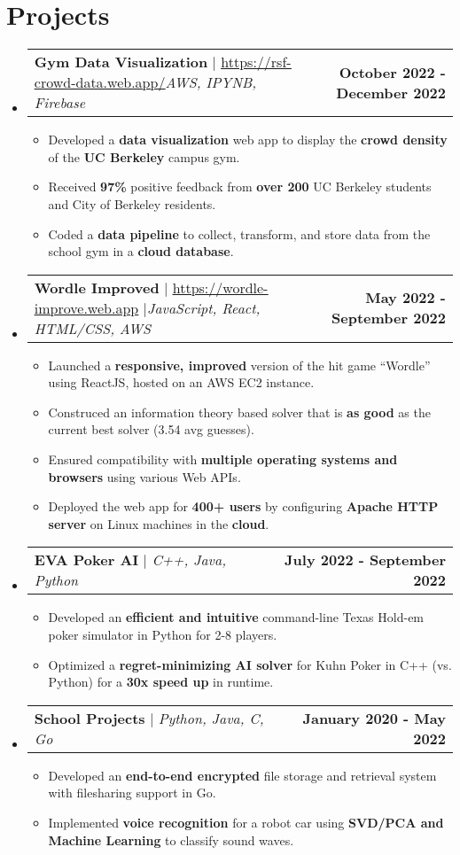 \documentclass[letterpaper,11pt]{article}
\makeatletter
\newcommand{\resumeItem}[1]{
  \item\small{
    {#1 \vspace{-2pt}}
  }
}
\newcommand{\resumeProjectHeading}[2]{
    \item
    \begin{tabular*}{1.001\textwidth}{l@{\extracolsep{\fill}}r}
      \small#1 & \textbf{\small #2}\\
    \end{tabular*}\vspace{-7pt}
}
\newcommand{\resumeSubHeadingListStart}{\begin{itemize}[leftmargin=0.0in, label={}]}
\newcommand{\resumeSubHeadingListEnd}{\end{itemize}}
\newcommand{\resumeItemListStart}{\begin{itemize}}
\newcommand{\resumeItemListEnd}{\end{itemize}\vspace{-5pt}}
\makeatother
\begin{document}
\section{Projects}
    \vspace{-5pt}
    \resumeSubHeadingListStart
    \resumeProjectHeading
      {\textbf{Gym Data Visualization} $|$ \href{https://rsf-crowd-data.web.app/}{\underline{https://rsf-crowd-data.web.app/}}\emph{AWS, IPYNB, Firebase}}{October 2022 - December 2022}
      \resumeItemListStart
      \resumeItem{Developed a \textbf{data visualization} web app to display the \textbf{crowd density} of the \textbf{UC Berkeley} campus gym.}
      \resumeItem{Received \textbf{97\%} positive feedback from \textbf{over 200} UC Berkeley students and City of Berkeley residents.}
      \resumeItem{Coded a \textbf{data pipeline} to collect, transform, and store data from the school gym in a \textbf{cloud database}.}
      \resumeItemListEnd
      \vspace{-13pt}
      \resumeProjectHeading
          {\textbf{Wordle Improved} $|$ \href{https://wordle-improve.web.app/}{\underline{https://wordle-improve.web.app}} $|$\emph{JavaScript, React, HTML/CSS, AWS}}{May 2022 - September 2022}
          \resumeItemListStart
            \resumeItem{Launched a \textbf{responsive, improved} version of the hit game ``Wordle'' using ReactJS, hosted on an AWS EC2 instance.}
            \resumeItem{Construced an information theory based solver that is \textbf{\boldmath{$97\%$} as good} as the current best solver (3.54 avg guesses).}
            \resumeItem{Ensured compatibility with \textbf{multiple operating systems and browsers} using various Web APIs.}
            \resumeItem{Deployed the web app for \textbf{400+ users} by configuring \textbf{Apache HTTP server} on Linux machines in the \textbf{cloud}.}
            \resumeItemListEnd
          \vspace{-13pt}
      \resumeProjectHeading
      {\textbf{EVA Poker AI} $|$ \emph{C++, Java, Python}}{July 2022 - September 2022}
      \resumeItemListStart
            \resumeItem{Developed an \textbf{efficient and intuitive} command-line Texas Hold-em poker simulator in Python for 2-8 players.}
            \resumeItem{Optimized a \textbf{regret-minimizing AI solver} for Kuhn Poker in C++ (vs. Python) for a \textbf{30x speed up} in runtime. }
          \resumeItemListEnd 
          \vspace{-13pt}
      
      \resumeProjectHeading
      {\textbf{School Projects} $|$ \emph{Python, Java, C, Go}}{January 2020 - May 2022}
          \resumeItemListStart
          \resumeItem{Developed an \textbf{end-to-end encrypted} file storage and retrieval system with filesharing support in Go.}
          \resumeItem{Implemented \textbf{voice recognition} for a robot car using \textbf{SVD/PCA and Machine Learning} to classify sound waves.}
          \resumeItemListEnd 
    \resumeSubHeadingListEnd
\vspace{-10pt}
\end{document}
